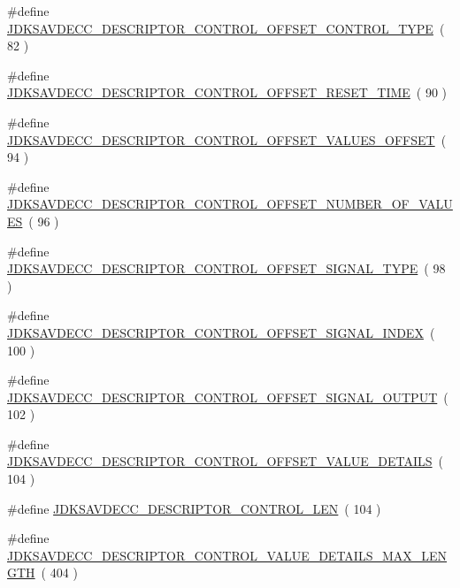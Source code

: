 \begin{DoxyCompactItemize}
\item 
\#define \hyperlink{group__descriptor__control_ga01b8a5d6bfd748119eafd911252fe644}{J\+D\+K\+S\+A\+V\+D\+E\+C\+C\+\_\+\+D\+E\+S\+C\+R\+I\+P\+T\+O\+R\+\_\+\+C\+O\+N\+T\+R\+O\+L\+\_\+\+O\+F\+F\+S\+E\+T\+\_\+\+C\+O\+N\+T\+R\+O\+L\+\_\+\+T\+Y\+PE}~( 82 )
\item 
\#define \hyperlink{group__descriptor__control_ga96ec4992318ff38004b5ed502dbfa7a1}{J\+D\+K\+S\+A\+V\+D\+E\+C\+C\+\_\+\+D\+E\+S\+C\+R\+I\+P\+T\+O\+R\+\_\+\+C\+O\+N\+T\+R\+O\+L\+\_\+\+O\+F\+F\+S\+E\+T\+\_\+\+R\+E\+S\+E\+T\+\_\+\+T\+I\+ME}~( 90 )
\item 
\#define \hyperlink{group__descriptor__control_gad0a9e7e73ddfc16a79a3526466bcee3a}{J\+D\+K\+S\+A\+V\+D\+E\+C\+C\+\_\+\+D\+E\+S\+C\+R\+I\+P\+T\+O\+R\+\_\+\+C\+O\+N\+T\+R\+O\+L\+\_\+\+O\+F\+F\+S\+E\+T\+\_\+\+V\+A\+L\+U\+E\+S\+\_\+\+O\+F\+F\+S\+ET}~( 94 )
\item 
\#define \hyperlink{group__descriptor__control_ga79a60cc1d3a5b735c95a7c0b2c0e9895}{J\+D\+K\+S\+A\+V\+D\+E\+C\+C\+\_\+\+D\+E\+S\+C\+R\+I\+P\+T\+O\+R\+\_\+\+C\+O\+N\+T\+R\+O\+L\+\_\+\+O\+F\+F\+S\+E\+T\+\_\+\+N\+U\+M\+B\+E\+R\+\_\+\+O\+F\+\_\+\+V\+A\+L\+U\+ES}~( 96 )
\item 
\#define \hyperlink{group__descriptor__control_ga30e60ef3f5bd7efb76412a37b3be5956}{J\+D\+K\+S\+A\+V\+D\+E\+C\+C\+\_\+\+D\+E\+S\+C\+R\+I\+P\+T\+O\+R\+\_\+\+C\+O\+N\+T\+R\+O\+L\+\_\+\+O\+F\+F\+S\+E\+T\+\_\+\+S\+I\+G\+N\+A\+L\+\_\+\+T\+Y\+PE}~( 98 )
\item 
\#define \hyperlink{group__descriptor__control_ga4f1c188b79a1c18fbdc1cd27bfd8bd21}{J\+D\+K\+S\+A\+V\+D\+E\+C\+C\+\_\+\+D\+E\+S\+C\+R\+I\+P\+T\+O\+R\+\_\+\+C\+O\+N\+T\+R\+O\+L\+\_\+\+O\+F\+F\+S\+E\+T\+\_\+\+S\+I\+G\+N\+A\+L\+\_\+\+I\+N\+D\+EX}~( 100 )
\item 
\#define \hyperlink{group__descriptor__control_gad16d603693de6c94f9794d1e165714ef}{J\+D\+K\+S\+A\+V\+D\+E\+C\+C\+\_\+\+D\+E\+S\+C\+R\+I\+P\+T\+O\+R\+\_\+\+C\+O\+N\+T\+R\+O\+L\+\_\+\+O\+F\+F\+S\+E\+T\+\_\+\+S\+I\+G\+N\+A\+L\+\_\+\+O\+U\+T\+P\+UT}~( 102 )
\item 
\#define \hyperlink{group__descriptor__control_gac167bc92816a1021b1df08fd10d60b2f}{J\+D\+K\+S\+A\+V\+D\+E\+C\+C\+\_\+\+D\+E\+S\+C\+R\+I\+P\+T\+O\+R\+\_\+\+C\+O\+N\+T\+R\+O\+L\+\_\+\+O\+F\+F\+S\+E\+T\+\_\+\+V\+A\+L\+U\+E\+\_\+\+D\+E\+T\+A\+I\+LS}~( 104 )
\item 
\#define \hyperlink{group__descriptor__control_gae9df372af3485fb181d19f0a820260b1}{J\+D\+K\+S\+A\+V\+D\+E\+C\+C\+\_\+\+D\+E\+S\+C\+R\+I\+P\+T\+O\+R\+\_\+\+C\+O\+N\+T\+R\+O\+L\+\_\+\+L\+EN}~( 104 )
\item 
\#define \hyperlink{group__descriptor__control_gab18c746a9ec92585628613e7415d1cff}{J\+D\+K\+S\+A\+V\+D\+E\+C\+C\+\_\+\+D\+E\+S\+C\+R\+I\+P\+T\+O\+R\+\_\+\+C\+O\+N\+T\+R\+O\+L\+\_\+\+V\+A\+L\+U\+E\+\_\+\+D\+E\+T\+A\+I\+L\+S\+\_\+\+M\+A\+X\+\_\+\+L\+E\+N\+G\+TH}~( 404 )
\end{DoxyCompactItemize}

